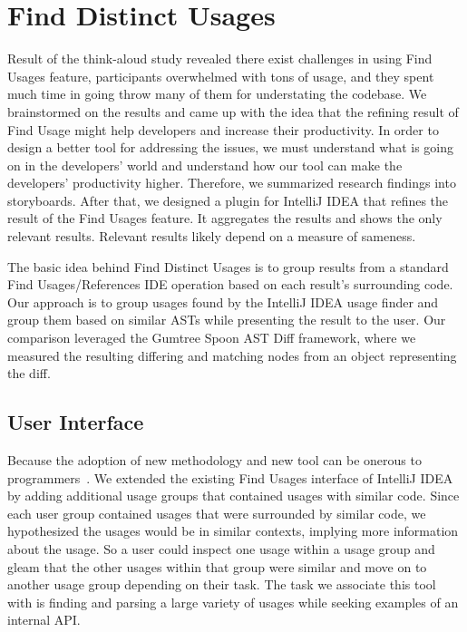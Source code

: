 \documentclass[conference]{IEEEtran}
\begin{document}
\section{Find Distinct Usages}
Result of the think-aloud study revealed there exist challenges in using Find Usages feature, participants overwhelmed with tons of usage, and they spent much time in going throw many of them for understating the codebase. We brainstormed on the results and came up with the idea that the refining result of Find Usage might help developers and increase their productivity. In order to design a better tool for addressing the issues, we must understand what is going on in the developers' world and understand how our tool can make the developers' productivity higher. Therefore, we summarized research findings into storyboards. After that, we designed a plugin for IntelliJ IDEA that refines the result of the Find Usages feature. It aggregates the results and shows the only relevant results. Relevant results likely depend on a measure of sameness.\par
The basic idea behind Find Distinct Usages is to group results from a standard Find Usages/References IDE operation based on each result's surrounding code. Our approach is to group usages found by the IntelliJ IDEA usage finder and group them based on similar ASTs while presenting the result to the user. Our comparison leveraged the Gumtree Spoon AST Diff framework, where we measured the resulting differing and matching nodes from an object representing the diff. \par



\subsection{User Interface} 

Because the adoption of new methodology and new tool can be onerous to programmers~\cite{adaption2002}. We extended the existing Find Usages interface of IntelliJ IDEA by adding additional usage groups that contained usages with similar code. Since each user group contained usages that were surrounded by similar code, we hypothesized the usages would be in similar contexts, implying more information about the usage. So a user could inspect one usage within a usage group and gleam that the other usages within that group were similar and move on to another usage group depending on their task. The task we associate this tool with is finding and parsing a large variety of usages while seeking examples of an internal API.
\end{document}
